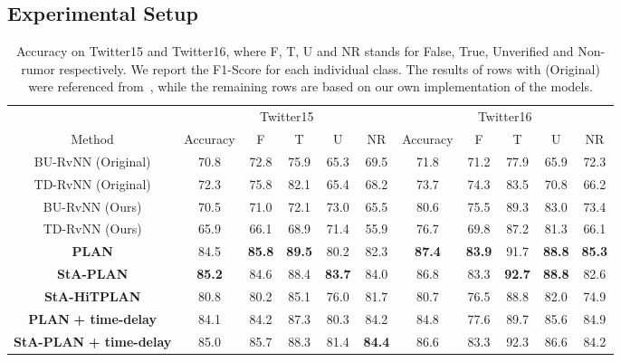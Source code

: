 \documentclass[letterpaper]{article} %
\begin{document}
\subsection{Experimental Setup}

\begin{table}[ht]
\small
\centering
\begin{tabular}{ccccccccccc} \toprule
& \multicolumn{5}{c}{Twitter15} & \multicolumn{5}{c}{Twitter16} \\
Method		&	Accuracy & F & T & U & NR & Accuracy & F & T & U & NR \\ \midrule
BU-RvNN	(Original) & 70.8 & 72.8 & 75.9 & 65.3 & 69.5
& 71.8 & 71.2 & 77.9 & 65.9 & 72.3\\
TD-RvNN (Original) & 72.3 & 75.8 & 82.1 & 65.4 & 68.2
& 73.7 & 74.3 & 83.5 & 70.8 & 66.2 \\
BU-RvNN (Ours)	& 70.5 & 71.0 & 72.1 & 73.0 & 65.5
& 80.6 & 75.5 & 89.3 & 83.0 & 73.4\\
TD-RvNN	(Ours) & 65.9 & 66.1 & 68.9 & 71.4 & 55.9
& 76.7 & 69.8 & 87.2 & 81.3 & 66.1 \\
\midrule
\textbf{PLAN}	& 84.5 & \textbf{85.8} & \textbf{89.5} & 80.2 & 82.3
& \textbf{87.4} & \textbf{83.9} & 91.7 & \textbf{88.8} & \textbf{85.3} \\
\textbf{StA-PLAN} & \textbf{85.2} & 84.6 & 88.4 & \textbf{83.7} & 84.0
& 86.8 & 83.3 & \textbf{92.7} & \textbf{88.8} & 82.6\\
\textbf{StA-HiTPLAN} & 80.8 & 80.2 & 85.1 & 76.0 & 81.7
& 80.7 & 76.5 & 88.8 & 82.0 & 74.9 \\
\textbf{PLAN} \textbf{+ time-delay}	& 84.1 & 84.2 & 87.3 & 80.3 & 84.2
& 84.8 & 77.6 & 89.7 & 85.6 & 84.9\\
\textbf{StA-PLAN} \textbf{+ time-delay} & 85.0 & 85.7 & 88.3 & 81.4 & \textbf{84.4}
& 86.6 & 83.3 & 92.3 & 86.6 & 84.2 \\
\bottomrule
\end{tabular}
\caption{Accuracy on Twitter15 and Twitter16, where F, T, U and NR stands for False, True, Unverified and Non-rumor respectively. We report the F1-Score for each individual class. The results of rows with (Original) were referenced from~\cite{ma17}, while the remaining rows are based on our own implementation of the models.}
\label{tab:results_15}
\end{table}
\end{document}
